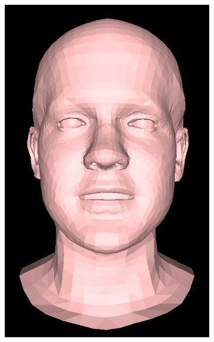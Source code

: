 \begin{figure}[h!]
\begin{subfigure}[b]{0.19\textwidth}
        \includegraphics[width=\textwidth]{figures/gen_sample/00029.png}
    \end{subfigure}
    \begin{subfigure}[b]{0.19\textwidth}

\end{subfigure}
\end{figure}
